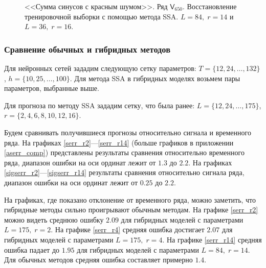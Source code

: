\documentclass[specialist,
               substylefile = spbu.rtx,
               subf,href,colorlinks=true, 12p]{disser}
\newcommand{\multiref}[2]{\ref{#1}---\ref{#2}}
\begin{document}
\begin{figure}[H]
	\captionsetup{justification=centering}
	\caption{<<Сумма синусов с красным шумом>>. Ряд $\mathsf{V}_{650}$. Восстановление тренировочной выборки с помощью метода SSA. $L = 84, \; r = 14$ и $L = 36, \; r = 16$.}
	\label{ser_ssa_r14_r16}
\end{figure}

\subsubsection{Сравнение обычных и гибридных методов}
\label{serr_comp}

Для нейронных сетей зададим следующую сетку параметров: $T = \{12, 24, \ldots, 132 \}$, $h = \{10, 25, \ldots, 100 \}$. Для метода SSA в гибридных моделях возьмем пары параметров, выбранные выше.

Для прогноза по методу SSA зададим сетку, что была ранее: $L = \{ 12, 24, \ldots, 175 \}$, $r = \{ 2, 4, 6, 8, 10, 12, 16 \}$.

Будем сравнивать получившиеся прогнозы относительно сигнала и временного ряда. На графиках \multiref{serr_r2}{serr_r14} (больше графиков в приложении \ref{aserr_comp}) представлены результаты сравнения относительно временного ряда, диапазон ошибки на оси ординат лежит от $1.3$ до $2.2$. На графиках \multiref{sigserr_r2}{sigserr_r14} результаты сравнения относительно сигнала ряда, диапазон ошибки на оси ординат лежит от $0.25$ до $2.2$.

На графиках, где показано отклонение от временного ряда, можно заметить, что гибридные методы сильно проигрывают обычным методам. На графике \ref{serr_r2} можно видеть среднюю ошибку $2.09$ для гибридных моделей с параметрами $L = 175, \; r = 2$. На графике \ref{serr_r4} средняя ошибка достигает $2.07$ для гибридных моделей с параметрами $L = 175, \; r = 4$. На графике \ref{serr_r14} средняя ошибка падает до $1.95$ для гибридных моделей с параметрами $L = 84, \; r = 14$. Для обычных методов средняя ошибка составляет примерно $1.4$.
\end{document}
